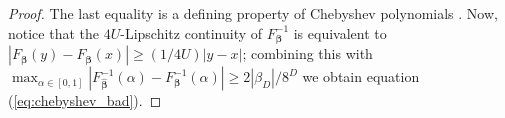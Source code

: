 \documentclass[twoside,11pt]{article}
\begin{document}
\begin{proof}
The last equality is a defining property of Chebyshev polynomials \citep{mason}. Now,  notice that the $4U$-Lipschitz continuity of $F_{\boldsymbol{\beta}}^{-1} $ is equivalent to $|F_{\boldsymbol{\beta}}(y) - F_{\boldsymbol{\beta}}(x)| \geq  (1/4U) |y-x|$; combining this with $\max_{\alpha \in [0,1] }|F^{-1}_{\boldsymbol{\hat \beta}}(\alpha) - F^{-1}_{\boldsymbol{\beta}}(\alpha)|\geq 2 |\beta_{D}|/8^D$ we obtain equation (\ref{eq:chebyshev_bad}).
\end{proof}
\end{document}
